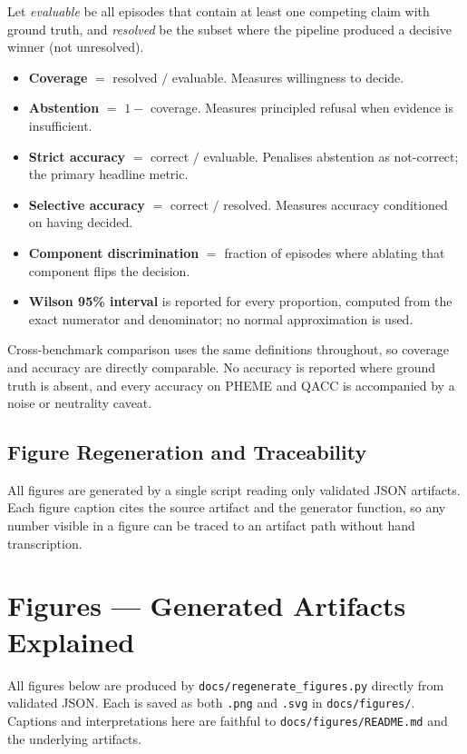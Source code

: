 \documentclass[12pt,a4paper]{article}
\begin{document}
Let \textit{evaluable} be all episodes that contain at least one competing claim with ground truth, and \textit{resolved} be the subset where the pipeline produced a decisive winner (not unresolved).

\begin{itemize}[leftmargin=*]
  \item \textbf{Coverage} $=$ resolved $/$ evaluable. Measures willingness to decide.
  \item \textbf{Abstention} $=$ $1-$ coverage. Measures principled refusal when evidence is insufficient.
  \item \textbf{Strict accuracy} $=$ correct $/$ evaluable. Penalises abstention as not-correct; the primary headline metric.
  \item \textbf{Selective accuracy} $=$ correct $/$ resolved. Measures accuracy conditioned on having decided.
  \item \textbf{Component discrimination} $=$ fraction of episodes where ablating that component flips the decision.
  \item \textbf{Wilson 95\% interval} is reported for every proportion, computed from the exact numerator and denominator; no normal approximation is used.
\end{itemize}

Cross-benchmark comparison uses the same definitions throughout, so coverage and accuracy are directly comparable. No accuracy is reported where ground truth is absent, and every accuracy on PHEME and QACC is accompanied by a noise or neutrality caveat.

\subsection{Figure Regeneration and Traceability}
All figures are generated by a single script reading only validated JSON artifacts. Each figure caption cites the source artifact and the generator function, so any number visible in a figure can be traced to an artifact path without hand transcription.

\section{Figures --- Generated Artifacts Explained}
All figures below are produced by \texttt{docs/regenerate\_figures.py} directly from validated JSON. Each is saved as both \texttt{.png} and \texttt{.svg} in \texttt{docs/figures/}. Captions and interpretations here are faithful to \texttt{docs/figures/README.md} and the underlying artifacts.
\end{document}
